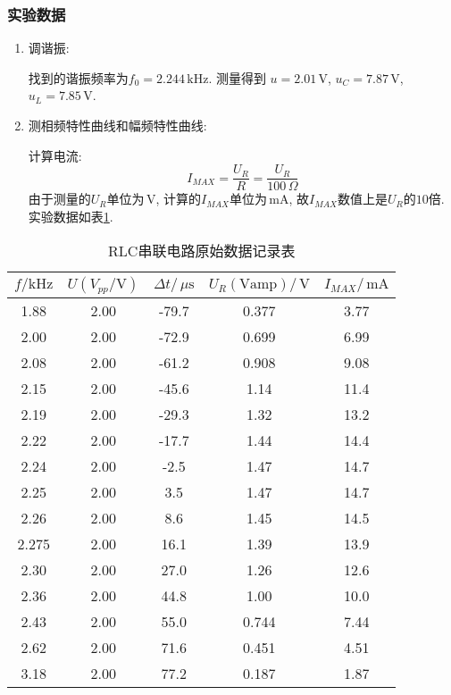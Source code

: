 \documentclass[11pt]{article}
\newcommand{\unit}[1]{\,\mathrm{#1}}
\newcommand{\cunit}[1]{\,#1} %
\begin{document}
\subsubsection{实验数据}
\begin{enumerate}
	
	\item 调谐振:
	
	找到的谐振频率为$f_0= 2.244\unit{kHz}$. 测量得到 $u = 2.01\unit{V}$, $u_C = 7.87\unit{V}$, $u_L  = 7.85\unit{V}$.
	
	\item 测相频特性曲线和幅频特性曲线:
	
	计算电流:
	\[
	I_{MAX} = \frac{U_R}{R} =  \frac{U_R}{100\cunit{\Omega}}
	\]
	由于测量的$U_R$单位为$\unit{V}$, 计算的$I_{MAX}$单位为$\unit{mA}$, 故$I_{MAX}$数值上是$U_R$的$10$倍. 实验数据如表\ref{tab:series}.
\end{enumerate}
\begin{table}[htbp]
	\centering
	\begin{tabular}{|c|c|c|c|c|}
		\hline
		$f/\mathrm{kHz}$ &  $U(V_{pp}/\mathrm{V})$    & $\Delta t/\cunit{\mu\mathrm{s}}$      & $U_R\mathrm{(Vamp)}/\unit{V}$     &   $I_{MAX}/\unit{mA}$   \\ \hline
		1.88  & 2.00 & -79.7 & 0.377 & 3.77 \\ \hline
		2.00  & 2.00 & -72.9 & 0.699 & 6.99 \\ \hline
		2.08  & 2.00 & -61.2 & 0.908 & 9.08 \\ \hline
		2.15  & 2.00 & -45.6 & 1.14  & 11.4 \\ \hline
		2.19  & 2.00 & -29.3 & 1.32  & 13.2 \\ \hline
		2.22  & 2.00 & -17.7 & 1.44  & 14.4 \\ \hline
		2.24  & 2.00 & -2.5  & 1.47  & 14.7 \\ \hline
		2.25  & 2.00 & 3.5   & 1.47  & 14.7 \\ \hline
		2.26  & 2.00 & 8.6   & 1.45  & 14.5 \\ \hline
		2.275 & 2.00 & 16.1  & 1.39  & 13.9 \\ \hline
		2.30  & 2.00 & 27.0  & 1.26  & 12.6 \\ \hline
		2.36  & 2.00 & 44.8  & 1.00  & 10.0 \\ \hline
		2.43  & 2.00 & 55.0  & 0.744 & 7.44 \\ \hline
		2.62  & 2.00 & 71.6  & 0.451 & 4.51 \\ \hline
		3.18  & 2.00 & 77.2  & 0.187 & 1.87 \\ \hline
	\end{tabular}
	\caption{RLC串联电路原始数据记录表}
	\label{tab:series}
\end{table}
\end{document}
